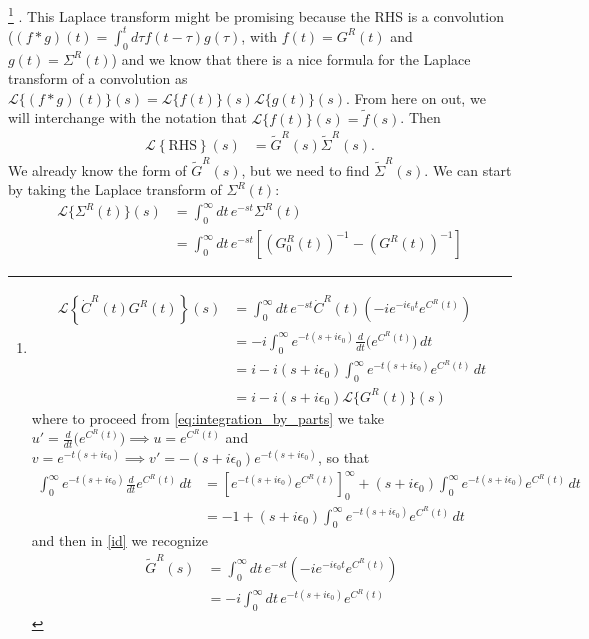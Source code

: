 \footnote{
\begin{align}
\mathcal{L}\left\{\dot{C}^R(t)G^R(t)\right\}(s)
&=\int_0^\infty dt\, e^{-s t} \dot{C}^R(t) \left(-i e^{-i \epsilon_0 t} e^{C^R(t)}\right) \\
&= -i \int_0^\infty e^{-t(s + i\epsilon_0)} \frac{d}{dt}\big(e^{C^R(t)}\big)\, dt \label{eq:integration_by_parts}\\
&= i - i(s + i\epsilon_0)\int_0^\infty e^{-t(s + i\epsilon_0)} e^{C^R(t)}\,dt \label{id}\\
&= i - i(s + i\epsilon_0)\mathcal{L}\{G^R(t)\}(s)
\end{align}
where to proceed from \eqref{eq:integration_by_parts} we take $u' = \frac{d}{dt}\big(e^{C^R(t)}\big) \implies u = e^{C^R(t)}$ and $v = e^{-t(s + i\epsilon_0)} \implies v' = - (s + i\epsilon_0)e^{-t(s + i\epsilon_0)}$, so that
\begin{align}
\int_0^\infty e^{-t(s + i\epsilon_0)} \frac{d}{dt}e^{C^R(t)}\,dt
&= \left[e^{-t(s + i\epsilon_0)} e^{C^R(t)}\right]_0^\infty 
+ (s + i\epsilon_0)\int_0^\infty e^{-t(s + i\epsilon_0)} e^{C^R(t)}\,dt \\
&= -1 + (s + i\epsilon_0)\int_0^\infty e^{-t(s + i\epsilon_0)} e^{C^R(t)}\,dt
\end{align}
and then in \eqref{id} we recognize 
\begin{align}
\tilde{G}^R(s)&=\int_0^\infty dt\, e^{-s t} \left(-i e^{-i \epsilon_0 t} e^{C^R(t)}\right) \\
&=-i \int_0^\infty dt\, e^{-t\left(s+i \epsilon_0\right)} e^{C^R(t)}
\end{align}
}
. This Laplace transform might be promising because the RHS is a convolution ($(f*g)(t)=\int_0^t d \tau f(t-\tau) g(\tau)$, with $f(t)=G^R(t)$ and $g(t)=\Sigma^R(t)$) and we know that there is a nice formula for the Laplace transform of a convolution as $\mathcal{L}\{(f*g)(t)\}(s)=\mathcal{L}\{f(t)\}(s) \mathcal{L}\{g(t)\}(s)$. From here on out, we will interchange with the notation that $\mathcal{L}\{f(t)\}(s)=\tilde{f}(s)$. 
Then
\begin{align}
\mathcal{L}\left\{\text{RHS}\right\}(s) &=\tilde{G}^R(s) \tilde{\Sigma}^R(s).
\end{align}
We already know the form of $\tilde{G}^R(s)$, but we need to find $\tilde{\Sigma}^R(s)$. We can start by taking the Laplace transform of $\Sigma^R(t)$:
\begin{align}
\mathcal{L}\{\Sigma^R(t)\}(s)&=\int_0^\infty dt\, e^{-s t} \Sigma^R(t) \\
&=\int_0^\infty dt\, e^{-s t} \left[ \left(G_0^R(t)\right)^{-1} - \left(G^R(t)\right)^{-1} \right]
\end{align}
